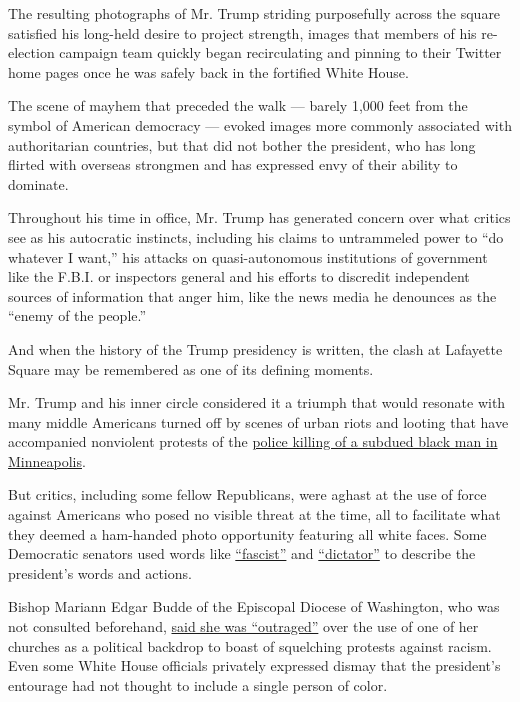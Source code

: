 The resulting photographs of Mr. Trump striding purposefully across the
square satisfied his long-held desire to project strength, images that
members of his re-election campaign team quickly began recirculating and
pinning to their Twitter home pages once he was safely back in the
fortified White House.

The scene of mayhem that preceded the walk --- barely 1,000 feet from
the symbol of American democracy --- evoked images more commonly
associated with authoritarian countries, but that did not bother the
president, who has long flirted with overseas strongmen and has
expressed envy of their ability to dominate.

Throughout his time in office, Mr. Trump has generated concern over what
critics see as his autocratic instincts, including his claims to
untrammeled power to ``do whatever I want,'' his attacks on
quasi-autonomous institutions of government like the F.B.I. or
inspectors general and his efforts to discredit independent sources of
information that anger him, like the news media he denounces as the
``enemy of the people.''

And when the history of the Trump presidency is written, the clash at
Lafayette Square may be remembered as one of its defining moments.

Mr. Trump and his inner circle considered it a triumph that would
resonate with many middle Americans turned off by scenes of urban riots
and looting that have accompanied nonviolent protests of the
\href{https://www.nytimes3xbfgragh.onion/2020/05/31/us/george-floyd-investigation.html}{police
killing of a subdued black man in Minneapolis}.

But critics, including some fellow Republicans, were aghast at the use
of force against Americans who posed no visible threat at the time, all
to facilitate what they deemed a ham-handed photo opportunity featuring
all white faces. Some Democratic senators used words like
\href{https://twitter.com/RonWyden/status/1267605801549664256}{``fascist''}
and
\href{https://twitter.com/KamalaHarris/status/1267603100656898049}{``dictator''}
to describe the president's words and actions.

Bishop Mariann Edgar Budde of the Episcopal Diocese of Washington, who
was not consulted beforehand,
\href{https://www.nytimes3xbfgragh.onion/2020/06/02/us/politics/trump-church.html}{said
she was ``outraged''} over the use of one of her churches as a political
backdrop to boast of squelching protests against racism. Even some White
House officials privately expressed dismay that the president's
entourage had not thought to include a single person of color.

